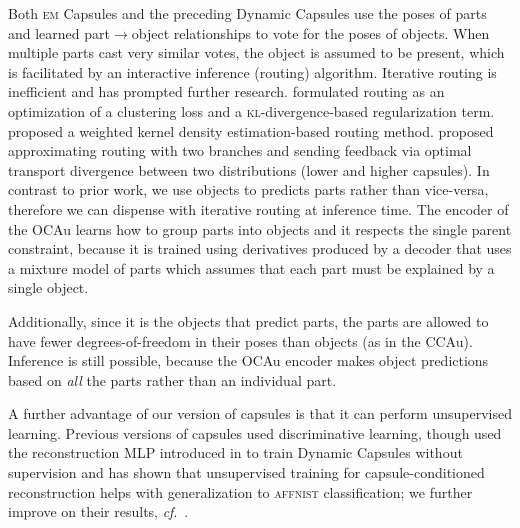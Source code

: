 Both \textsc{em} Capsules and the preceding Dynamic Capsules \citep{Sabour2017capsule} use the poses of parts and learned part$\rightarrow$object relationships to vote for the poses of objects. When multiple parts cast very similar votes, the object is assumed to be present, which is facilitated by an interactive inference (routing) algorithm. Iterative routing is inefficient and has prompted further research. \cite{wang2018optimization} formulated routing as an optimization of a clustering loss and a \textsc{kl}-divergence-based regularization term.  \cite{zhang2018fast} proposed a weighted kernel density estimation-based routing method. \cite{encapsule} proposed approximating routing with two branches and sending feedback via optimal transport divergence between two distributions (lower and higher capsules). 
In contrast to prior work, we use objects to predicts parts rather than vice-versa, therefore we can dispense with iterative routing at inference time. The encoder of the \gls{OCAu} learns how to group parts into objects and it respects the single parent constraint, because it is trained using derivatives produced by a decoder that uses a mixture model of parts which assumes that each part must be explained by a single object. 

Additionally, since it is the objects that predict parts, the parts are allowed to have fewer degrees-of-freedom in their poses than objects (as in the \gls{CCAu}). 
Inference is still possible, because the \gls{OCAu} encoder makes object predictions based on {\it all} the parts rather than an individual part.

A further advantage of our version of capsules is that it can perform unsupervised learning. Previous versions of capsules used discriminative learning, though \cite{sparsecaps} used the reconstruction \gls{MLP} introduced in \cite{Sabour2017capsule} to train Dynamic Capsules without supervision and has shown that unsupervised training for capsule-conditioned reconstruction helps with generalization to \textsc{affnist} classification; we further improve on their results, \textit{cf}.\ .

% 

